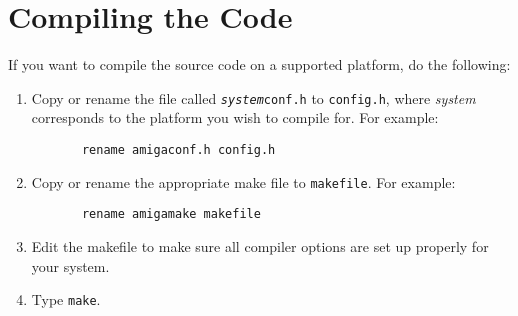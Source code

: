 \chapter{Compiling the Code}

If you want to compile the source code on a supported platform, do the
following:

\begin{enumerate}
\item Copy or rename the file called {\tt {\em system}conf.h} to
{\tt config.h}, where {\em system} corresponds to the platform you
wish to compile for. For example:
\begin{verbatim}
       rename amigaconf.h config.h
\end{verbatim}

\item Copy or rename the appropriate make file to {\tt makefile}. For
example:
\begin{verbatim}
       rename amigamake makefile
\end{verbatim}

\item Edit the makefile to make sure all compiler options are set up
properly for your system.

\item Type {\tt make}.
\end{enumerate}
